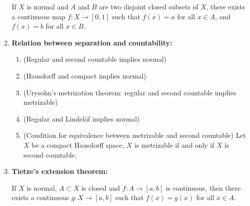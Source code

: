 \documentclass[letterpaper, 12pt]{book}
\begin{document}
\begin{enumerate}[resume]
        If $X$ is normal and $A$ and $B$ are two disjoint closed subsets of $X$, there exists a continuous map $f : X\to [0,1]$ such that $f(x) = a$ for all $x\in A$, and $f(x) = b$ for all $x\in B$. %
    \item \textbf{Relation between separation and countability:}
        \begin{enumerate}
        \item (Regular and second countable implies normal)
        \item (Hausdorff and compact implies normal)
        \item (Urysohn's metrization theorem: regular and second countable implies metrizable) %
        \item (Regular and Lindel\"of implies normal)
        \item (Condition for equivalence between metrizable and second countable) Let $X$ be a compact Hausdorff space, $X$ is metrizable if and only if $X$ is second countable.
        \end{enumerate}
    \item \textbf{Tietze's extension theorem:}

        If $X$ is normal, $A\subset X$ is closed and $f : A\to [a,b]$ is continuous, then there exists a continuous $g : X\to [a,b]$ such that $f(x) = g(x)$ for all $x\in A$. %
    \end{enumerate}

\end{document}
